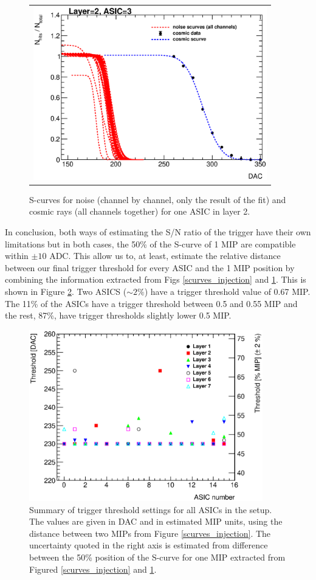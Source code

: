 \documentclass[a4paper,11pt]{article}
\begin{document}
\begin{figure}[!t]
    \centering
  \begin{tabular}{l}
	\includegraphics[width=4in]{figs/commissioning/cosmic_scurves_asic3_layer2.eps} 
	\end{tabular}
\caption{S-curves for noise (channel by channel, only the result of the fit) and cosmic rays (all channels together) for one ASIC in layer 2.}
\label{scurves_cosmics}
\end{figure}

In conclusion, both ways of estimating the S/N ratio of the trigger have their own limitations but in 
both cases, the 50\% of the S-curve of 1 MIP are compatible within $\pm10$ ADC. This allow us
to, at least, estimate the relative distance between our final trigger threshold for every ASIC and 
the 1 MIP position by combining the information extracted from Figs \ref{scurves_injection} and \ref{scurves_cosmics}.
This is shown in Figure \ref{trigger_thresholds}. Two ASICS ($\sim2\%$) have a
trigger threshold value of 0.67 MIP. The 11\% of the ASICs have a trigger threshold between 0.5 and 0.55 MIP and the rest, 87\%, have trigger thresholds slightly lower 0.5 MIP.

\begin{figure}[!t]
  \centering
  \includegraphics[width=4in]{figs/commissioning/threshold_chip.eps}
  \caption{Summary of trigger threshold settings for all ASICs in the setup. The values are given in DAC and in estimated MIP units, using the distance between two MIPs from Figure \ref{scurves_injection}. The uncertainty quoted in the right axis is estimated from difference between the 50\% position of the S-curve for one MIP extracted from Figured \ref{scurves_injection} and \ref{scurves_cosmics}.}
\label{trigger_thresholds}
\end{figure}
\end{document}
